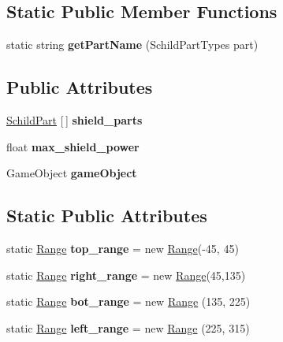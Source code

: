 \subsection*{Static Public Member Functions}
\begin{DoxyCompactItemize}
\item 
\mbox{\label{class_schild_a0e4558c57dc4265c120f8a8037acb8a7}} 
static string {\bfseries get\+Part\+Name} (Schild\+Part\+Types part)
\end{DoxyCompactItemize}
\subsection*{Public Attributes}
\begin{DoxyCompactItemize}
\item 
\hyperlink{class_schild_part}{Schild\+Part} \mbox{[}$\,$\mbox{]} {\bfseries shield\+\_\+parts}
\item 
\mbox{\label{class_schild_a1f4825774fe941e08212dcc78f48a01a}} 
float {\bfseries max\+\_\+shield\+\_\+power}
\item 
\mbox{\label{class_schild_a59ff88d7aeec08d7867cd9afe317d039}} 
Game\+Object {\bfseries game\+Object}
\end{DoxyCompactItemize}
\subsection*{Static Public Attributes}
\begin{DoxyCompactItemize}
\item 
\mbox{\label{class_schild_ae625b7f328d43a3329c0fad580efe128}} 
static \hyperlink{class_range}{Range} {\bfseries top\+\_\+range} = new \hyperlink{class_range}{Range}(-\/45, 45)
\item 
\mbox{\label{class_schild_a24f7eb6079dd872d9bf2491842786252}} 
static \hyperlink{class_range}{Range} {\bfseries right\+\_\+range} = new \hyperlink{class_range}{Range}(45,135)
\item 
\mbox{\label{class_schild_ab5ad027e113698bcb9d93b27ebac090b}} 
static \hyperlink{class_range}{Range} {\bfseries bot\+\_\+range} = new \hyperlink{class_range}{Range} (135, 225)
\item 
\mbox{\label{class_schild_a753a53a47f0c7e0abf6259514beeca3d}} 
static \hyperlink{class_range}{Range} {\bfseries left\+\_\+range} = new \hyperlink{class_range}{Range} (225, 315)
\end{DoxyCompactItemize}
